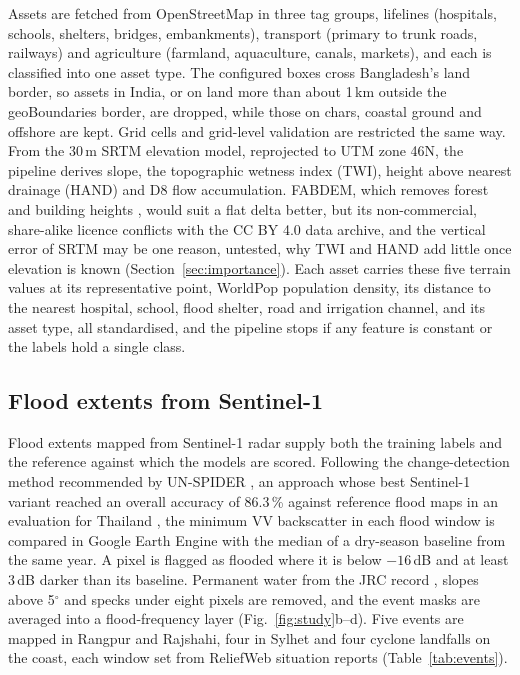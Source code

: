 \documentclass[10pt,a4paper,twocolumn]{article}
\begin{document}
Assets are fetched from OpenStreetMap in three tag groups, lifelines (hospitals, schools, shelters, bridges, embankments), transport (primary to trunk roads, railways) and agriculture (farmland, aquaculture, canals, markets), and each is classified into one asset type. The configured boxes cross Bangladesh's land border, so assets in India, or on land more than about 1\,km outside the geoBoundaries border, are dropped, while those on chars, coastal ground and offshore are kept. Grid cells and grid-level validation are restricted the same way. From the 30\,m SRTM elevation model, reprojected to UTM zone 46N, the pipeline derives slope, the topographic wetness index (TWI), height above nearest drainage (HAND) and D8 flow accumulation. FABDEM, which removes forest and building heights \citep{hawker2022}, would suit a flat delta better, but its non-commercial, share-alike licence conflicts with the CC BY 4.0 data archive, and the vertical error of SRTM may be one reason, untested, why TWI and HAND add little once elevation is known (Section~\ref{sec:importance}). Each asset carries these five terrain values at its representative point, WorldPop population density, its distance to the nearest hospital, school, flood shelter, road and irrigation channel, and its asset type, all standardised, and the pipeline stops if any feature is constant or the labels hold a single class.

\subsection{Flood extents from Sentinel-1}
\label{sec:observed}

Flood extents mapped from Sentinel-1 radar supply both the training labels and the reference against which the models are scored. Following the change-detection method recommended by UN-SPIDER \citep{unspider}, an approach whose best Sentinel-1 variant reached an overall accuracy of 86.3\,\% against reference flood maps in an evaluation for Thailand \citep{dadhich2026}, the minimum VV backscatter in each flood window is compared in Google Earth Engine with the median of a dry-season baseline from the same year. A pixel is flagged as flooded where it is below $-16$\,dB and at least 3\,dB darker than its baseline. Permanent water from the JRC record \citep{pekel2016}, slopes above 5$^\circ$ and specks under eight pixels are removed, and the event masks are averaged into a flood-frequency layer (Fig.~\ref{fig:study}b--d). Five events are mapped in Rangpur and Rajshahi, four in Sylhet and four cyclone landfalls on the coast, each window set from ReliefWeb situation reports (Table~\ref{tab:events}).
\end{document}

